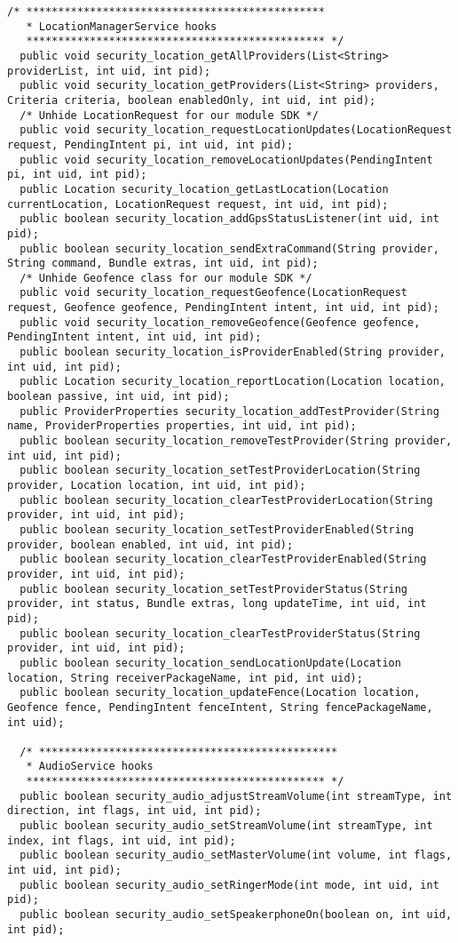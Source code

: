 \documentclass[letterpaper,twocolumn,10pt]{article}
\begin{document}
\begin{lstlisting}[emph={},basicstyle=\footnotesize,caption={Interface for Access Control Policy Modules}]
  /* ***********************************************
   * LocationManagerService hooks
   *********************************************** */
  public void security_location_getAllProviders(List<String> providerList, int uid, int pid);
  public void security_location_getProviders(List<String> providers, Criteria criteria, boolean enabledOnly, int uid, int pid);
  /* Unhide LocationRequest for our module SDK */
  public void security_location_requestLocationUpdates(LocationRequest request, PendingIntent pi, int uid, int pid);
  public void security_location_removeLocationUpdates(PendingIntent pi, int uid, int pid);
  public Location security_location_getLastLocation(Location currentLocation, LocationRequest request, int uid, int pid);
  public boolean security_location_addGpsStatusListener(int uid, int pid);
  public boolean security_location_sendExtraCommand(String provider, String command, Bundle extras, int uid, int pid);
  /* Unhide Geofence class for our module SDK */
  public void security_location_requestGeofence(LocationRequest request, Geofence geofence, PendingIntent intent, int uid, int pid);
  public void security_location_removeGeofence(Geofence geofence, PendingIntent intent, int uid, int pid);
  public boolean security_location_isProviderEnabled(String provider, int uid, int pid);
  public Location security_location_reportLocation(Location location, boolean passive, int uid, int pid);
  public ProviderProperties security_location_addTestProvider(String name, ProviderProperties properties, int uid, int pid);
  public boolean security_location_removeTestProvider(String provider, int uid, int pid);
  public boolean security_location_setTestProviderLocation(String provider, Location location, int uid, int pid);
  public boolean security_location_clearTestProviderLocation(String provider, int uid, int pid);
  public boolean security_location_setTestProviderEnabled(String provider, boolean enabled, int uid, int pid);
  public boolean security_location_clearTestProviderEnabled(String provider, int uid, int pid);
  public boolean security_location_setTestProviderStatus(String provider, int status, Bundle extras, long updateTime, int uid, int pid);
  public boolean security_location_clearTestProviderStatus(String provider, int uid, int pid);
  public boolean security_location_sendLocationUpdate(Location location, String receiverPackageName, int pid, int uid);
  public boolean security_location_updateFence(Location location, Geofence fence, PendingIntent fenceIntent, String fencePackageName, int uid);
  
  /* ***********************************************
   * AudioService hooks
   *********************************************** */
  public boolean security_audio_adjustStreamVolume(int streamType, int direction, int flags, int uid, int pid);
  public boolean security_audio_setStreamVolume(int streamType, int index, int flags, int uid, int pid);
  public boolean security_audio_setMasterVolume(int volume, int flags, int uid, int pid);
  public boolean security_audio_setRingerMode(int mode, int uid, int pid);
  public boolean security_audio_setSpeakerphoneOn(boolean on, int uid, int pid);
  

\end{lstlisting}
\end{document}
